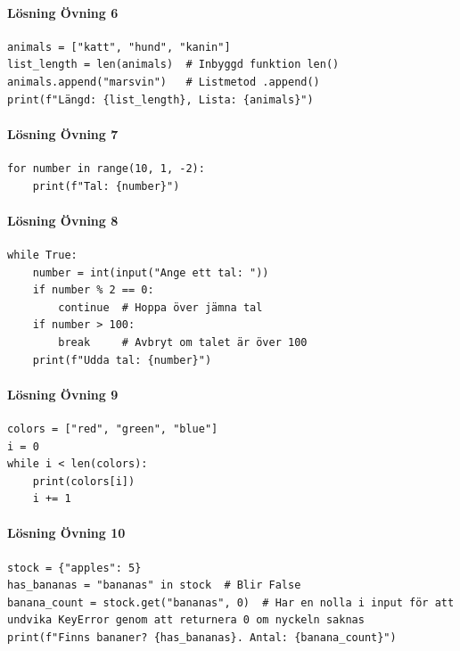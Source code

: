 \documentclass{article}
\begin{document}
\paragraph{Lösning Övning 6}
\begin{lstlisting}
animals = ["katt", "hund", "kanin"]
list_length = len(animals)  # Inbyggd funktion len()
animals.append("marsvin")   # Listmetod .append()
print(f"Längd: {list_length}, Lista: {animals}")
\end{lstlisting}

\paragraph{Lösning Övning 7}
\begin{lstlisting}
for number in range(10, 1, -2):
    print(f"Tal: {number}")
\end{lstlisting}

\paragraph{Lösning Övning 8}
\begin{lstlisting}
while True:
    number = int(input("Ange ett tal: "))
    if number % 2 == 0:
        continue  # Hoppa över jämna tal
    if number > 100:
        break     # Avbryt om talet är över 100
    print(f"Udda tal: {number}")
\end{lstlisting}

\paragraph{Lösning Övning 9}
\begin{lstlisting}
colors = ["red", "green", "blue"]
i = 0
while i < len(colors):
    print(colors[i])
    i += 1
\end{lstlisting}

\paragraph{Lösning Övning 10}
\begin{lstlisting}
stock = {"apples": 5}
has_bananas = "bananas" in stock  # Blir False
banana_count = stock.get("bananas", 0)  # Har en nolla i input för att undvika KeyError genom att returnera 0 om nyckeln saknas
print(f"Finns bananer? {has_bananas}. Antal: {banana_count}")
\end{lstlisting}
\end{document}
